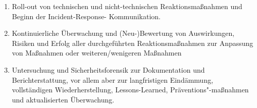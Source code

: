 \begin{enumerate}
    \item Roll-out von technischen und nicht-technischen Reaktionsmaßnahmen und Beginn der Incident-Response-
    Kommunikation.
    \item Kontinuierliche Überwachung und (Neu-)Bewertung von Auswirkungen, Risiken und Erfolg aller 
    durchgeführten Reaktionsmaßnahmen zur Anpassung von Maßnahmen oder weiteren/wenigeren Maßnahmen
    \item Untersuchung und Sicherheitsforensik zur Dokumentation und Berichterstattung, vor allem aber zur 
    langfristigen Eindämmung, vollständigen Wiederherstellung, Lessons-Learned, Präventions"-maßnahmen und 
    aktualisierten Überwachung.
\end{enumerate}